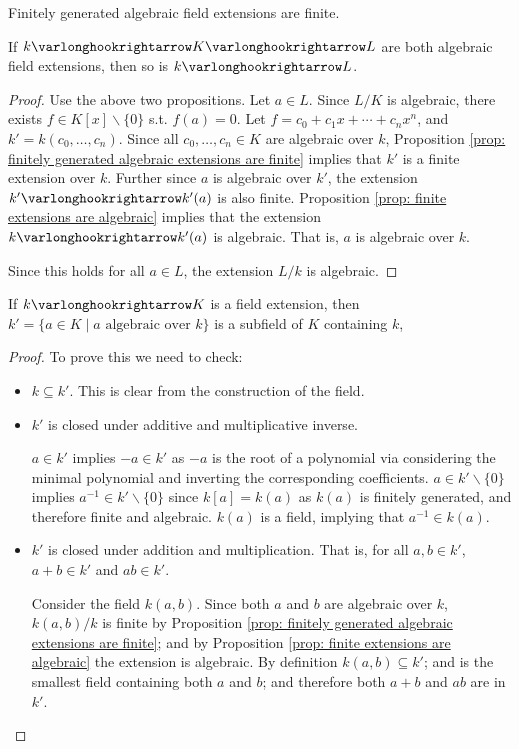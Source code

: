 \documentclass{article}
\begin{document}
\begin{corollary}
    Finitely generated algebraic field extensions are finite.
\end{corollary}

\begin{proposition}
    If $k \ext K \ext L$ are both algebraic field extensions, then so is $k \ext L$.
\end{proposition}

\begin{proof}
    Use the above two propositions. Let $a \in L$. Since $L/K$ is algebraic, there exists $f \in K[x] \smallsetminus \{0\}$ s.t. $f(a) = 0$. Let $f = c_0 + c_1 x + \cdots + c_n x^n$, and $k' = k(c_0, \dots, c_n)$. Since all $c_0, \dots, c_n \in K$ are algebraic over $k$, Proposition \ref{prop: finitely generated algebraic extensions are finite} implies that $k'$ is a finite extension over $k$. Further since $a$ is algebraic over $k'$, the extension $k' \ext k'(a)$ is also finite. Proposition \ref{prop: finite extensions are algebraic} implies that the extension $k \ext k'(a)$ is algebraic. That is, $a$ is algebraic over $k$.

    Since this holds for all $a \in L$, the extension $L/k$ is algebraic.
\end{proof}

\begin{proposition}\label{prop: algebraic closure is a field}
    If $k \ext K$ is a field extension, then $k' = \{a \in K \mid \text{$a$ algebraic over $k$}\}$ is a subfield of $K$ containing $k$,
\end{proposition}

\begin{proof}
    To prove this we need to check:
    \begin{itemize}
        \item $k \subseteq k'$. This is clear from the construction of the field.
        \item $k'$ is closed under additive and multiplicative inverse. 
        
        $a \in k'$ implies $-a \in k'$ as $-a$ is the root of a polynomial via considering the minimal polynomial and inverting the corresponding coefficients. $a \in k' \smallsetminus \{0\}$ implies $a^{-1} \in k' \smallsetminus \{0\}$ since $k[a] = k(a)$ as $k(a)$ is finitely generated, and therefore finite and algebraic. $k(a)$ is a field, implying that $a^{-1} \in k(a)$.
        \item $k'$ is closed under addition and multiplication. That is, for all $a, b \in k'$, $a + b \in k'$ and $ab \in k'$.

        Consider the field $k(a, b)$. Since both $a$ and $b$ are algebraic over $k$, $k(a, b)/k$ is finite by Proposition \ref{prop: finitely generated algebraic extensions are finite}; and by Proposition \ref{prop: finite extensions are algebraic} the extension is algebraic. By definition $k(a, b) \subseteq k'$; and is the smallest field containing both $a$ and $b$; and therefore both $a + b$ and $ab$ are in $k'$.
    \end{itemize}
\end{proof}
\end{document}
